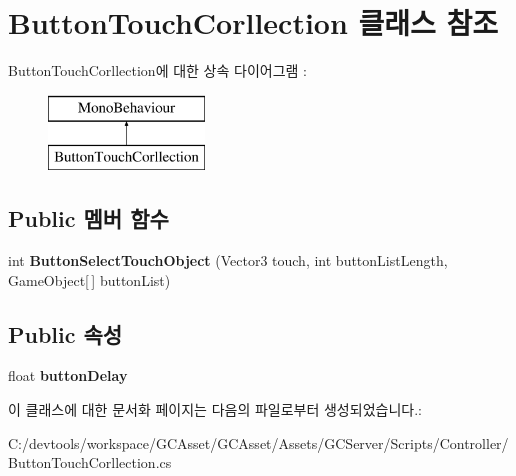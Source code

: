 \hypertarget{class_button_touch_corllection}{}\section{Button\+Touch\+Corllection 클래스 참조}
\label{class_button_touch_corllection}
Button\+Touch\+Corllection에 대한 상속 다이어그램 \+: \begin{figure}[H]
\begin{center}
\leavevmode
\includegraphics[height=2.000000cm]{class_button_touch_corllection}
\end{center}
\end{figure}
\subsection*{Public 멤버 함수}
\begin{DoxyCompactItemize}
\item 
\hypertarget{class_button_touch_corllection_a48c4028a6779d58c83d2ee19d33db4f4}{}int {\bfseries Button\+Select\+Touch\+Object} (Vector3 touch, int button\+List\+Length, Game\+Object\mbox{[}$\,$\mbox{]} button\+List)\label{class_button_touch_corllection_a48c4028a6779d58c83d2ee19d33db4f4}

\end{DoxyCompactItemize}
\subsection*{Public 속성}
\begin{DoxyCompactItemize}
\item 
\hypertarget{class_button_touch_corllection_a37a3646652283d963d1e40e2433f4de7}{}float {\bfseries button\+Delay}\label{class_button_touch_corllection_a37a3646652283d963d1e40e2433f4de7}

\end{DoxyCompactItemize}


이 클래스에 대한 문서화 페이지는 다음의 파일로부터 생성되었습니다.\+:\begin{DoxyCompactItemize}
\item 
C\+:/devtools/workspace/\+G\+C\+Asset/\+G\+C\+Asset/\+Assets/\+G\+C\+Server/\+Scripts/\+Controller/Button\+Touch\+Corllection.\+cs\end{DoxyCompactItemize}
